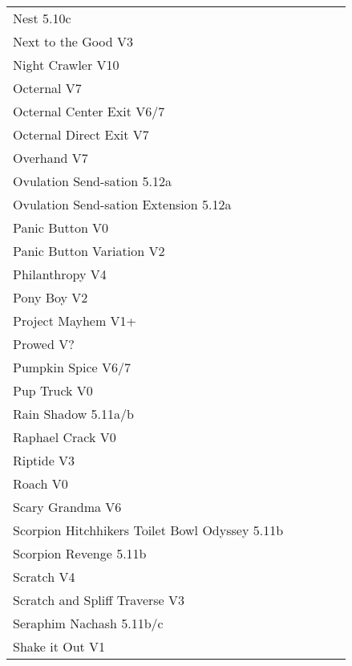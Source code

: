 \begin{flushleft}
\begin{center}
\begin{supertabular}{p{0.76\linewidth}p{0.08\linewidth}}
Nest 5.10c & \pageref{rt:Nest} \\
Next to the Good V3 & \pageref{rt:Next to the Good} \\
Night Crawler V10 & \pageref{rt:Night Crawler} \\
Octernal V7 & \pageref{rt:Octernal} \\
Octernal Center Exit V6/7 & \pageref{vr:Octernal Center Exit} \\
Octernal Direct Exit V7 & \pageref{vr:Octernal Direct Exit} \\
Overhand V7 & \pageref{rt:Overhand} \\
Ovulation Send-sation 5.12a & \pageref{rt:Ovulation Send-sation} \\
Ovulation Send-sation Extension 5.12a & \pageref{vr:Ovulation Send-sation Extension} \\
Panic Button V0 & \pageref{rt:Panic Button} \\
Panic Button Variation V2 & \pageref{vr:Panic Button Variation} \\
Philanthropy V4 & \pageref{rt:Philanthropy} \\
Pony Boy V2 & \pageref{rt:Pony Boy} \\
Project Mayhem V1+ & \pageref{rt:Project Mayhem} \\
Prowed V? & \pageref{vr:Prowed} \\
Pumpkin Spice V6/7 & \pageref{rt:Pumpkin Spice} \\
Pup Truck V0 & \pageref{rt:Pup Truck} \\
Rain Shadow 5.11a/b & \pageref{rt:Rain Shadow} \\
Raphael Crack V0 & \pageref{rt:Raphael Crack} \\
Riptide V3 & \pageref{rt:Riptide} \\
Roach V0 & \pageref{rt:Roach} \\
Scary Grandma V6 & \pageref{rt:Scary Grandma} \\
Scorpion Hitchhikers Toilet Bowl Odyssey 5.11b & \pageref{rt:Scorpion Hitchhikers Toilet Bowl Odyssey} \\
Scorpion Revenge 5.11b & \pageref{rt:Scorpion Revenge} \\
Scratch V4 & \pageref{rt:Scratch} \\
Scratch and Spliff Traverse V3 & \pageref{rt:Scratch and Spliff Traverse} \\
Seraphim Nachash 5.11b/c & \pageref{rt:Seraphim Nachash} \\
Shake it Out V1 & \pageref{rt:Shake it Out} \\

\end{supertabular}
\end{center}
\end{flushleft}
